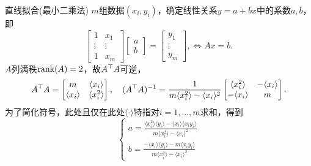 \begin{example}{直线拟合(最小二乘法)}{}
	$m$组数据$(x_i,y_i)$，确定线性关系$y=a+bx$中的系数$a,b$，即 
	\[
		\begin{bmatrix}
			1&x_1\\\vdots&\vdots\\1&x_m
		\end{bmatrix}
		\begin{bmatrix}
			a\\b
		\end{bmatrix}=
		\begin{bmatrix}
			y_1\\\vdots\\y_m
		\end{bmatrix},\iff Ax=b.
	\]
	\newcommand*{\sumi}[1]{\langle{#1}\rangle}
	$A$列满秩$\operatorname{rank}(A)=2$，故$A^\top A$可逆，
	\[
		A\tp A=
		\begin{bmatrix}
			m&\sumi{x_i}\\
			\sumi{x_i}&\sumi{x_i^2}
		\end{bmatrix},\quad
		(A\tp A)\iv=\frac1{m\sumi{x_i^2}-\sumi{x_i}^2}
		\begin{bmatrix}
			\sumi{x_i^2}&-\sumi{x_i}\\
			-\sumi{x_i}&m
		\end{bmatrix}.
	\]
	为了简化符号，此处且仅在此处$\sumi{\cdot}$特指对$i=1,\ldots,m$求和，得到 
	\begin{equation}
		\begin{cases}
			a=\frac{\sumi{x_i^2}\sumi{y_i}-\sumi{x_i}\sumi{x_iy_i}}{m\sumi{x_i^2}-\sumi{x_i}^2}\\[2ex]
			b=\frac{-\sumi{x_i}\sumi{y_i}-m\sumi{x_iy_i}}{m\sumi{x_i^2}-\sumi{x_i}^2}
		\end{cases}
	\end{equation}
	\iffalse
	\[
		A\tp A=
		\begin{bmatrix}
			n&\textstyle\sum_{i=1}^n x_i\\
			\textstyle\sum_{i=1}^n x_i&\textstyle\sum_{i=1}^n x_i^2
		\end{bmatrix}
	\]
	则
	\[
		(A\tp A)\iv=\frac1{\textstyle{n\sum_{i=1}^n x_i^2-\bigkh{\sum_{i=1}^n x_i}^2}}
		\begin{bmatrix}
			\textstyle\sum_{i=1}^n x_i^2&-\textstyle\sum_{i=1}^n x_i\\
			-\textstyle\sum_{i=1}^n x_i&n
		\end{bmatrix}
	\]
	得到 
	\[
		\begin{cases}
			a=\frac{\textstyle\sum_{i=1}^n x_i^2\sum_{i=1}^n y_i-\sum_{i=1}^n x_i\sum_{i=1}^n x_iy_i}{\textstyle{n\sum_{i=1}^n x_i^2-\bigkh{\sum_{i=1}^n x_i}^2}}\\[2ex]
			b=\frac{\textstyle-\sum_{i=1}^n x_i\sum_{i=1}^n y_i-n\sum_{i=1}^n x_iy_i}{\textstyle{n\sum_{i=1}^n x_i^2-\bigkh{\sum_{i=1}^n x_i}^2}}
		\end{cases}
	\]
	\fi
\end{example}
